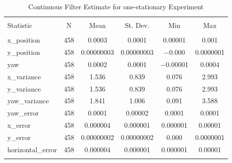 
\begin{table}[h] \centering 
  \caption{Continuous Filter Estimate for one-stationary Experiment} 
  \label{tab:one_stationary_continuous_summary} 
\begin{tabular}{@{\extracolsep{5pt}}lccccc} 
\\[-1.8ex]\hline 
\hline \\[-1.8ex] 
Statistic & \multicolumn{1}{c}{N} & \multicolumn{1}{c}{Mean} & \multicolumn{1}{c}{St. Dev.} & \multicolumn{1}{c}{Min} & \multicolumn{1}{c}{Max} \\ 
\hline \\[-1.8ex] 
x\_position & 458 & \num{0.0003} & \num{0.0001} & \num{0.00001} & \num{0.001} \\ 
y\_position & 458 & \num{0.00000003} & \num{0.00000003} & $-$0.000 & \num{0.0000001} \\ 
yaw & 458 & \num{0.0002} & \num{0.0001} & $-$0.00001 & \num{0.0004} \\ 
x\_variance & 458 & \num{1.536} & \num{0.839} & \num{0.076} & \num{2.993} \\ 
y\_variance & 458 & \num{1.536} & \num{0.839} & \num{0.076} & \num{2.993} \\ 
yaw\_variance & 458 & \num{1.841} & \num{1.006} & \num{0.091} & \num{3.588} \\ 
yaw\_error & 458 & \num{0.0001} & \num{0.00002} & \num{0.0001} & \num{0.0001} \\ 
x\_error & 458 & \num{0.000004} & \num{0.000001} & \num{0.000001} & \num{0.00001} \\ 
y\_error & 458 & \num{0.00000002} & \num{0.00000002} & \num{0.000} & \num{0.0000001} \\ 
horizontal\_error & 458 & \num{0.000004} & \num{0.000001} & \num{0.000001} & \num{0.00001} \\ 
\hline \\[-1.8ex] 
\end{tabular} 
\end{table} 
